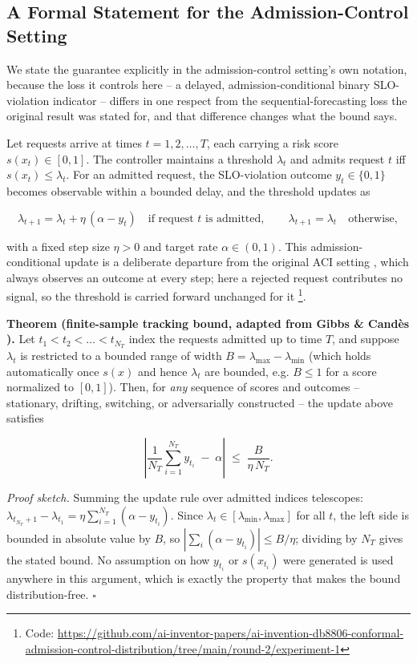 \documentclass[11pt,letterpaper]{article}
\begin{document}
\subsection{A Formal Statement for the Admission-Control Setting}

We state the guarantee explicitly in the admission-control setting's own notation, because the loss it controls here -- a delayed, admission-conditional binary SLO-violation indicator -- differs in one respect from the sequential-forecasting loss the original result was stated for, and that difference changes what the bound says.

Let requests arrive at times $t = 1, 2, \dots, T$, each carrying a risk score $s(x_t) \in [0, 1]$. The controller maintains a threshold $\lambda_t$ and admits request $t$ iff $s(x_t) \le \lambda_t$. For an admitted request, the SLO-violation outcome $y_t \in \{0, 1\}$ becomes observable within a bounded delay, and the threshold updates as

$$\lambda_{t+1} = \lambda_t + \eta \, (\alpha - y_t) \quad \text{if request } t \text{ is admitted}, \qquad \lambda_{t+1} = \lambda_t \quad \text{otherwise},$$

with a fixed step size $\eta > 0$ and target rate $\alpha \in (0, 1)$. This admission-conditional update is a deliberate departure from the original ACI setting \citep{Gibbs2021}, which always observes an outcome at every step; here a rejected request contributes no signal, so the threshold is carried forward unchanged for it \footnote{Code: \url{https://github.com/ai-inventor-papers/ai-invention-db8806-conformal-admission-control-distribution/tree/main/round-2/experiment-1}}.

\textbf{Theorem (finite-sample tracking bound, adapted from Gibbs \& Cand\`es \citep{Gibbs2021}).} Let $t_1 < t_2 < \dots < t_{N_T}$ index the requests admitted up to time $T$, and suppose $\lambda_t$ is restricted to a bounded range of width $B = \lambda_{\max} - \lambda_{\min}$ (which holds automatically once $s(x)$ and hence $\lambda_t$ are bounded, e.g. $B \le 1$ for a score normalized to $[0,1]$). Then, for \textit{any} sequence of scores and outcomes -- stationary, drifting, switching, or adversarially constructed -- the update above satisfies

$$\left| \frac{1}{N_T} \sum_{i=1}^{N_T} y_{t_i} \;-\; \alpha \right| \;\le\; \frac{B}{\eta \, N_T}.$$

\textit{Proof sketch.} Summing the update rule over admitted indices telescopes: $\lambda_{t_{N_T}+1} - \lambda_{t_1} = \eta \sum_{i=1}^{N_T} (\alpha - y_{t_i})$. Since $\lambda_t \in [\lambda_{\min}, \lambda_{\max}]$ for all $t$, the left side is bounded in absolute value by $B$, so $\left| \sum_i (\alpha - y_{t_i}) \right| \le B / \eta$; dividing by $N_T$ gives the stated bound. No assumption on how $y_{t_i}$ or $s(x_{t_i})$ were generated is used anywhere in this argument, which is exactly the property that makes the bound distribution-free. $\square$
\end{document}
